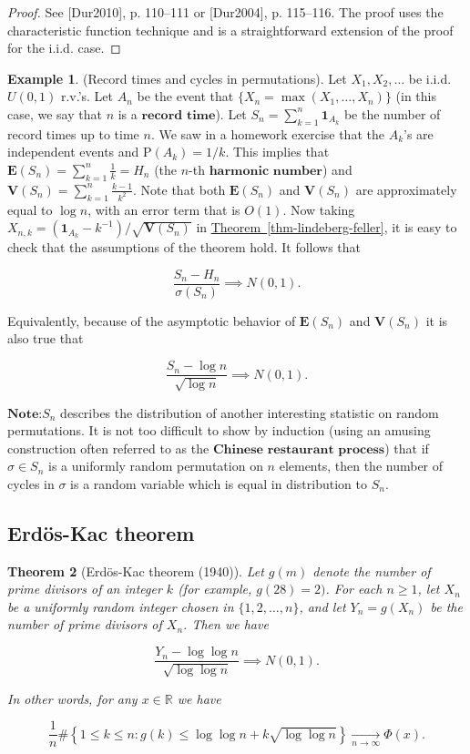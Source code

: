 \documentclass[11pt]{report}
\newcommand{\R}{\mathbb{R}}
\theoremstyle{plain}
\newtheorem{thm}{Theorem}[chapter]
\theoremstyle{definition}
\newtheorem{example}[thm]{Example}
\begin{document}
\begin{proof}
See [Dur2010], p. 110--111 or [Dur2004], p. 115--116.
The proof uses the characteristic function technique
and is a straightforward extension of the proof for
the i.i.d. case.
\end{proof}

\begin{example}
(Record times and cycles in permutations). Let
$X_1, X_2, \ldots$ be i.i.d. $U(0,1)$ r.v.'s. Let
$A_n$ be the event that
$\{X_n = \max(X_1,\ldots,X_n)\}$ (in this case, we
say that $n$ is a $\textbf{record time}$). Let
$S_n = \sum_{k=1}^n \mathbf{1}_{A_k}$ be the number
of record times up to time $n$. We saw in a homework
exercise that the $A_k$'s are independent events and
$\mathrm{P}(A_k) = 1/k$. This implies that
$\mathbf{E}(S_n) = \sum_{k=1}^n \frac{1}{k} = H_n$
(the $n$-th $\textbf{harmonic number}$) and
$\mathbf{V}(S_n) = \sum_{k=1}^n \frac{k-1}{k^2}$.
Note that both $\mathbf{E}(S_n)$ and $\mathbf{V}(S_n)$
are approximately equal to $\log n$, with an error
term that is $O(1)$. Now taking
$X_{n,k} =
(\mathbf{1}_{A_k}-k^{-1})/\sqrt{\mathbf{V}(S_n)}$
in \hyperref[thm-lindeberg-feller]{Theorem~\ref*{thm-lindeberg-feller}}, it is easy to check
that the assumptions of the theorem hold. It follows
that

\[
\frac{S_n-H_n}{\sigma(S_n)} \implies N(0,1).
\]

\noindent Equivalently, because of the asymptotic behavior of
$\mathbf{E}(S_n)$ and $\mathbf{V}(S_n)$ it is also
true that

\[
\frac{S_n-\log n}{\sqrt{\log n}} \implies N(0,1).
\]

\noindent $\textbf{Note:}$$S_n$ describes the distribution of
another interesting statistic on random permutations.
It is not too difficult to show by induction (using an
amusing construction often referred to as the
$\textbf{Chinese restaurant process}$) that if
$\sigma \in S_n$ is a uniformly random permutation on
$n$ elements, then the number of cycles in $\sigma$
is a random variable which is equal in distribution to
$S_n$.
\end{example}

\subsection{Erdös-Kac theorem}

\begin{thm}[Erdös-Kac theorem (1940)]
Let $g(m)$ denote the number of prime divisors of an
integer $k$ (for example, $g(28)=2)$. For each
$n\ge 1$, let $X_n$ be a uniformly random integer
chosen in $\{1,2,\ldots,n\}$, and let $Y_n=g(X_n)$ be
the number of prime divisors of $X_n$. Then we have

\[
\frac{Y_n - \log\log n}{\sqrt{\log\log n}} \implies N(0,1).
\]

\noindent In other words, for any $x\in\R$ we have

\[
\frac{1}{n}\# \left\{ 1\le k\le n: g(k) \le \log\log n + k \sqrt{\log\log n} \right\} \xrightarrow[n\to\infty]{} \Phi(x).
\]

\end{thm}
\end{document}
